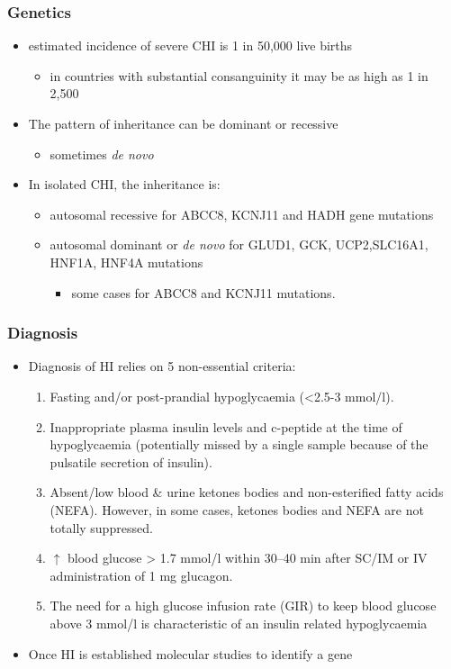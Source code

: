 \documentclass{scrartcl}
\begin{document}
\subsubsection{Genetics}
\label{sec:org4214b41}
\begin{itemize}
\item estimated incidence of severe CHI is 1 in 50,000 live births
\begin{itemize}
\item in countries with substantial consanguinity it may be as high as 1 in 2,500
\end{itemize}
\item The pattern of inheritance can be dominant or recessive
\begin{itemize}
\item sometimes \emph{de novo}
\end{itemize}
\item In isolated CHI, the inheritance is:
\begin{itemize}
\item autosomal recessive for ABCC8, KCNJ11 and HADH gene mutations
\item autosomal dominant or \emph{de novo} for GLUD1, GCK, UCP2,SLC16A1, HNF1A, HNF4A mutations
\begin{itemize}
\item some cases for ABCC8 and KCNJ11 mutations.
\end{itemize}
\end{itemize}
\end{itemize}

\subsubsection{Diagnosis}
\label{sec:org065891a}
\begin{itemize}
\item Diagnosis of HI relies on 5 non-essential criteria:
\begin{enumerate}
\item Fasting and/or post-prandial hypoglycaemia (<2.5-3 mmol/l).
\item Inappropriate plasma insulin levels and c-peptide at the time of
hypoglycaemia (potentially missed by a single sample because of
the pulsatile secretion of insulin).
\item Absent/low blood \& urine ketones bodies and non-esterified fatty
acids (NEFA). However, in some cases, ketones bodies and NEFA are
not totally suppressed.
\item \(\uparrow\) blood glucose \textgreater{} 1.7 mmol/l within 30–40 min after
SC/IM or IV administration of 1 mg glucagon.
\item The need for a high glucose infusion rate (GIR) to keep blood
glucose above 3 mmol/l is characteristic of an insulin related
hypoglycaemia
\end{enumerate}

\item Once HI is established molecular studies to identify a gene
\end{itemize}
\end{document}
